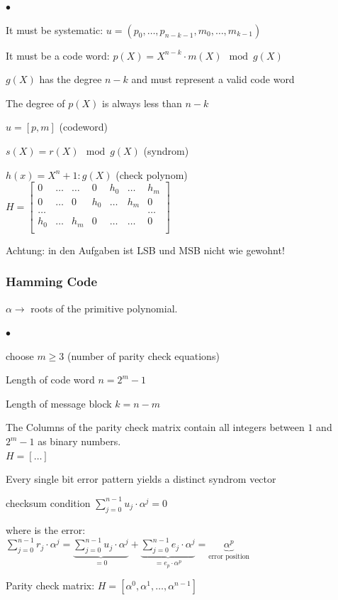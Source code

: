 \begin{list}{$\bullet$}{\setlength{\itemsep}{0cm} \setlength{\parsep}{0cm} \setlength{\topsep}{0.1cm}} 
  \item	It must be systematic: $u=(p_0,\ldots, p_{n-k-1}, m_0,\ldots,m_{k-1})$
  \item It must be a code word: $p(X)=X^{n-k}\cdot m(X) \mod g(X)$ \\
  \item $g(X)$ has the degree $n-k$ and must represent a valid code word
  \item The degree of $p(X)$ is always less than $n-k$
  \item $u=[p,m]$ (codeword)
  \item $s(X)=r(X)\mod g(X)$ (syndrom)
  \item $h(x)=X^n+1 : g(X)$ (check polynom)\\
        $H=\begin{bmatrix} 	
        			0	& \ldots	& \ldots	& 0 	& h_0		&	\ldots	&	h_m \\
        			0	& \ldots	& 0			& h_0	& \ldots	&	h_m		&	0	\\
        			\ldots &		&			&		&			&			&	\ldots \\
        			h_0	&	\ldots	& h_m		& 0		&	\ldots	&	\ldots	& 	0 \\
        \end{bmatrix}$  \\   
\end{list}
Achtung: in den Aufgaben ist LSB und MSB nicht wie gewohnt!\\

\subsubsection{Hamming Code}
$\alpha \to$ roots of the primitive polynomial.\\
\begin{list}{$\bullet$}{\setlength{\itemsep}{0cm} \setlength{\parsep}{0cm} \setlength{\topsep}{0.1cm}} 
  \item choose $m \geq 3$ (number of parity check equations)
  \item Length of code word $n=2^m-1$
  \item Length of message block $k=n-m$
  \item The Columns of the parity check matrix contain all integers between $1$ and $2^m-1$ as binary numbers. \\
		$H=[\ldots] $
  \item Every single bit error pattern yields a distinct syndrom vector
  \item checksum condition $\displaystyle\sum_{j=0}^{n-1}u_j \cdot \alpha^j = 0$
  \item where is the error:\\
  		$\displaystyle\sum_{j=0}^{n-1}r_j \cdot \alpha^j = \underbrace{\displaystyle\sum_{j=0}^{n-1}u_j \cdot \alpha^j}_{=0} + \underbrace{\displaystyle\sum_{j=0}^{n-1}e_j \cdot \alpha^j}_{=e_p \cdot \alpha^p}= \underbrace{\alpha^p}_{\text{error position}}$
  \item Parity check matrix: $H=[\alpha^0, \alpha^1, \ldots , \alpha^{n-1}]$

\end{list}

